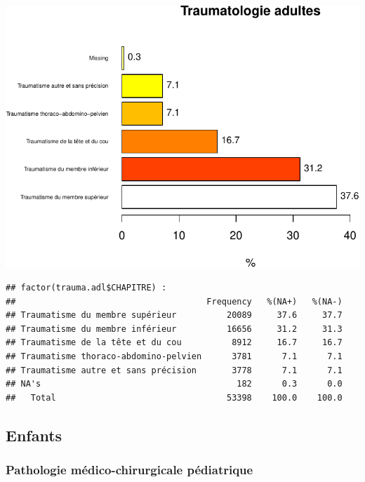 \documentclass[]{article}
\newenvironment{Shaded}{\begin{snugshade}}{\end{snugshade}}
\newcommand{\KeywordTok}[1]{\textcolor[rgb]{0.13,0.29,0.53}{\textbf{{#1}}}}
\newcommand{\DataTypeTok}[1]{\textcolor[rgb]{0.13,0.29,0.53}{{#1}}}
\newcommand{\FloatTok}[1]{\textcolor[rgb]{0.00,0.00,0.81}{{#1}}}
\newcommand{\StringTok}[1]{\textcolor[rgb]{0.31,0.60,0.02}{{#1}}}
\newcommand{\NormalTok}[1]{{#1}}
\begin{document}
\includegraphics{analyse_merge_files/figure-latex/trauma_adulte-1.pdf}

\begin{verbatim}
## factor(trauma.adl$CHAPITRE) : 
##                                      Frequency   %(NA+)   %(NA-)
## Traumatisme du membre supérieur          20089     37.6     37.7
## Traumatisme du membre inférieur          16656     31.2     31.3
## Traumatisme de la tête et du cou          8912     16.7     16.7
## Traumatisme thoraco-abdomino-pelvien      3781      7.1      7.1
## Traumatisme autre et sans précision       3778      7.1      7.1
## NA's                                       182      0.3      0.0
##   Total                                  53398    100.0    100.0
\end{verbatim}

\subsection{Enfants}\label{enfants}

\subsubsection{Pathologie médico-chirurgicale
pédiatrique}\label{pathologie-medico-chirurgicale-pediatrique}

\begin{Shaded}
\end{Shaded}
\end{document}
